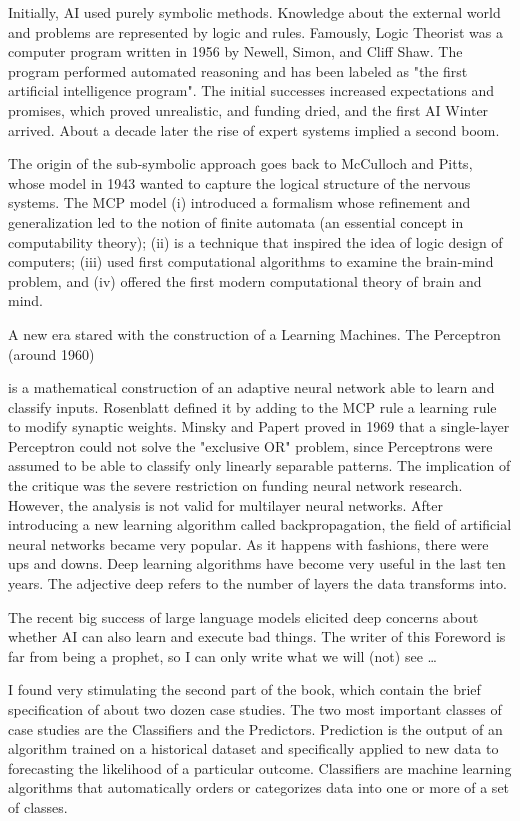 	Initially, AI used purely symbolic methods. Knowledge about the external world and problems are represented by logic and rules. Famously, Logic Theorist was a computer program written in 1956 by Newell, Simon, and Cliff Shaw. The program performed automated reasoning and has been labeled as "the first artificial intelligence program". The initial successes increased expectations and promises, which proved unrealistic, and funding dried, and the first AI Winter arrived. About a decade later the rise of expert systems implied a second boom.

	The origin of the sub-symbolic approach goes back to McCulloch and Pitts, whose model in 1943 wanted to capture the logical structure of the nervous systems. The MCP model (i) introduced a formalism whose refinement and generalization led to the notion of finite automata  (an essential concept in computability theory); (ii) is a technique that inspired the idea of logic design of computers;  (iii)  used first computational algorithms to examine the brain-mind problem, and (iv) offered the first modern computational theory of brain and mind.

	A new era stared with the construction of a Learning Machines. The Perceptron (around 1960) 

is a mathematical construction of an adaptive neural network able to learn and classify inputs. Rosenblatt defined it by adding to the MCP rule a learning rule to modify synaptic weights. Minsky
and Papert proved in 1969 that a single-layer Perceptron could not solve the "exclusive OR" problem, since Perceptrons were assumed to be able to classify only linearly separable patterns. The implication of the critique was the severe restriction on funding neural network research. However, the analysis is not valid for multilayer neural networks. After introducing a new learning algorithm called backpropagation, the field of artificial neural networks became very popular. As it happens with fashions, there were ups and downs. Deep learning algorithms have become very useful in the last ten years. The adjective deep refers to the number of layers the data transforms into. 

The recent big success of large language models elicited deep concerns about whether AI can also learn and execute bad things. The writer of this Foreword is far from being a prophet, so I can only write what we will (not) see …

I found very stimulating the second part of the book, which contain the brief specification of about two dozen case studies. The two most important classes of case studies are  the Classifiers and the Predictors. Prediction is the output of an algorithm trained on a historical dataset and specifically applied to new data to  forecasting the likelihood of a particular outcome. Classifiers are machine learning algorithms that automatically orders or categorizes data into one or more of a set of classes.


